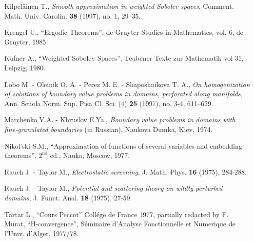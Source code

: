 \documentclass[10pt,reqno]{amsart}
\numberwithin{equation}{section}
\begin{document}
\begin{thebibliography}{99}
 {\rm Kilpel\"ainen T.},
{\it Smooth approximation in weighted Sobolev spaces},
Comment. Math. Univ. Carolin. {\bf 38}  (1997), no. 1, 29--35.

 {\rm Krengel U.}, ``Ergodic Theorems'',
de Gruyter Studies in Mathematics, vol. 6, de Gruyter, 1985.

 {\rm Kufner A.}, ``Weighted Sobolev Spaces'', Teubener
Texte zur Mathematik vol 31, Leipzig, 1980.

 {\rm Lobo M. - Oleinik O. A. - Perez M. E. - 
Shaposhnikova T. A.}, {\it On homogenization of solutions of boundary 
value problems in domains, perforated along manifolds,} 
Ann. Scuola Norm. Sup. Pisa Cl. Sci. (4) {\bf 25}  (1997),  
no. 3-4, 611--629.

 {\rm Marchenko V.A. - Khruslov E.Ya.},
{\it Boundary value problems in domains with
fine-granulated boundaries} (in Russian), Naukova Dumka, Kiev, 1974.

 {\rm Nikol'ski S.M.}, ``Approximation of functions of
several variables and embedding theorems'', $2^{\mathrm{nd}}$ ed.,
Nauka, Moscow, 1977.

 {\rm Rauch J. - Taylor M.},
{\it Electrostatic screening}, J. Math. Phys. {\bf 16} (1975), 284-288.

 {\rm Rauch J. - Taylor M.},
{\it Potential and scattering theory on wildly perturbed domains},
J. Funct. Anal. {\bf 18} (1975), 27-59.

 {\rm Tartar L.}, ``Cours Peccot'' Coll\'ege de France 1977,
partially redacted by F. Murat, ``H-convergence'', S\'eminaire
d'Analyse Fonctionnelle et Numerique de l'Univ. d'Alger, 1977/78.

\end{thebibliography}

\medskip
\end{document}
